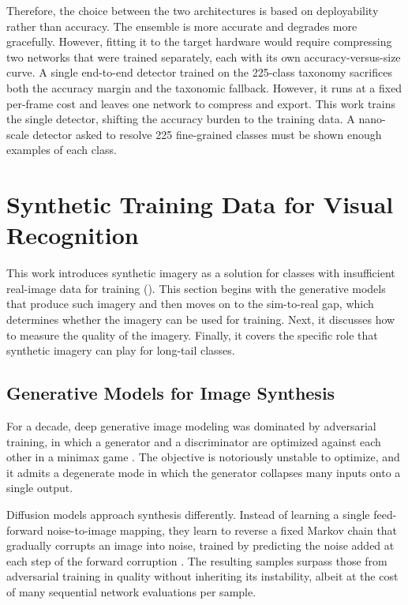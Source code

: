 Therefore, the choice between the two architectures is based on deployability rather than accuracy. The ensemble is more accurate and degrades more gracefully. However, fitting it to the target hardware would require compressing two networks that were trained separately, each with its own accuracy-versus-size curve. A single end-to-end detector trained on the 225-class taxonomy sacrifices both the accuracy margin and the taxonomic fallback. However, it runs at a fixed per-frame cost and leaves one network to compress and export. This work trains the single detector, shifting the accuracy burden to the training data. A nano-scale detector asked to resolve 225 fine-grained classes must be shown enough examples of each class.

\section{Synthetic Training Data for Visual Recognition}\label{sec:lit_synthetic_data}

This work introduces synthetic imagery as a solution for classes with insufficient real-image data for training (). This section begins with the generative models that produce such imagery and then moves on to the sim-to-real gap, which determines whether the imagery can be used for training. Next, it discusses how to measure the quality of the imagery. Finally, it covers the specific role that synthetic imagery can play for long-tail classes.

\subsection{Generative Models for Image Synthesis}\label{sec:lit_generative_models}

For a decade, deep generative image modeling was dominated by adversarial training, in which a generator and a discriminator are optimized against each other in a minimax game \cite{goodfellowGenerativeAdversarialNetworks2014}. The objective is notoriously unstable to optimize, and it admits a degenerate mode in which the generator collapses many inputs onto a single output.

Diffusion models approach synthesis differently. Instead of learning a single feed-forward noise-to-image mapping, they learn to reverse a fixed Markov chain that gradually corrupts an image into noise, trained by predicting the noise added at each step of the forward corruption \cite{hoDenoisingDiffusionProbabilistic2020}. The resulting samples surpass those from adversarial training in quality without inheriting its instability, albeit at the cost of many sequential network evaluations per sample.

